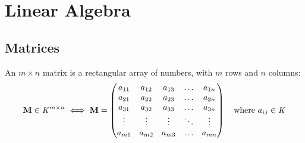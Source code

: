 \section{Linear Algebra}

\subsection{Matrices}

An \(m \times n\) matrix is a rectangular array of numbers, with \(m\) rows and
\(n\) columns:
\begin{equation*}
\mathbf{M} \in \mathit{K}^{m \times n} \iff \mathbf{M} =
\begin{pmatrix}
a_{11} & a_{12} & a_{13} & \dots & a_{1n} \\
a_{21} & a_{22} & a_{23} & \dots & a_{2n} \\
a_{31} & a_{32} & a_{33} & \dots & a_{3n} \\
\vdots & \vdots & \vdots & \ddots & \vdots \\
a_{m1} & a_{m2} & a_{m3} & \dots & a_{mn}
\end{pmatrix}
\quad \text{where \(a_{ij} \in \mathit{K}\)}
\end{equation*}


